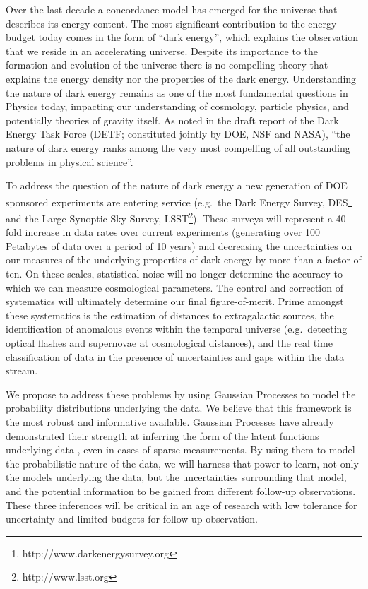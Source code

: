 \documentclass[useAMS,usenatbib,tightenlines,11pt,preprint]{aastex}
\begin{document}
Over the last decade a concordance model has emerged for the universe
that describes its energy content. The most significant contribution
to the energy budget today comes in the form of ``dark energy'', which
explains the observation that we reside in an accelerating
universe. Despite its importance to the formation and evolution of the
universe there is no compelling theory that explains the energy
density nor the properties of the dark energy. Understanding the
nature of dark energy remains as one of the most fundamental questions
in Physics today, impacting our understanding of cosmology, particle
physics, and potentially theories of gravity itself.  As noted in the draft
report of the Dark Energy Task Force (DETF; constituted jointly by
DOE, NSF and NASA), ``the nature of dark energy ranks among the very
most compelling of all outstanding problems in physical science''.


To address the question of the nature of dark energy a new generation
of DOE sponsored experiments are entering service (e.g.\ the Dark
Energy Survey, DES\footnote{http://www.darkenergysurvey.org} and the
Large Synoptic Sky Survey, LSST\footnote{http://www.lsst.org}).  These
surveys will represent a 40-fold increase in data rates over current
experiments (generating over 100 Petabytes of data over a period of 10
years) and decreasing the uncertainties on our measures of the
underlying properties of dark energy by more than a factor of ten. On
these scales, statistical noise will no longer determine the accuracy
to which we can measure cosmological parameters. The control and
correction of systematics will ultimately determine our final
figure-of-merit. Prime amongst these systematics is the estimation of
distances to extragalactic sources, the identification of anomalous
events within the temporal universe (e.g.\ detecting optical flashes
and supernovae at cosmological distances), and the real time
classification of data in the presence of uncertainties and gaps
within the data stream.

We propose to address these problems by using Gaussian Processes to model the
probability distributions underlying the data.  We believe that this framework
is the most robust and informative available.  Gaussian Processes have already
demonstrated their strength at inferring the form of the latent functions
underlying data \cite{ericgp,psf,daniel2012}, even in cases of sparse
measurements.  By using them to model the
probabilistic nature of the data, we will harness that power to learn, not only
the models underlying the data, but the uncertainties surrounding that model,
and the potential information to be gained from different follow-up
observations.  These three inferences will be critical in an age of
research with low tolerance for uncertainty and limited budgets for
follow-up observation. 
\end{document}
